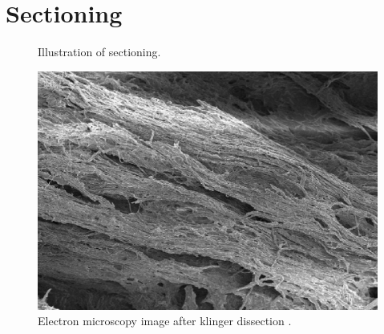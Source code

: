 \section{Sectioning}
%
\begin{figure}[!t]
	\centering
    \def\tikzwidth{0.75\textwidth}
	\caption{Illustration of sectioning.}
	\label{fig:brain_sectioning}
\end{figure}
% 
\begin{figure}[!t]
	\centering
	\includegraphics{gfx/neuroanatomy/human_wm_after_klinger_dissection.png}
	\caption{Electron microscopy image after klinger dissection \cite{destrieux:hal-01261930}.}
\end{figure}
% 
